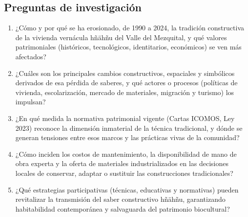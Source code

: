 \subsection{Preguntas de investigación}

\begin{enumerate}
	\item {¿Cómo y por qué se ha erosionado, de 1990 a 2024, la tradición constructiva de la vivienda vernácula hñähñu del Valle del Mezquital, y qué valores patrimoniales (históricos, tecnológicos, identitarios, económicos) se ven más afectados?}

	\item {¿Cuáles son los principales cambios constructivos, espaciales y simbólicos derivados de esa pérdida de saberes, y qué actores o procesos (políticas de vivienda, escolarización, mercado de materiales, migración y turismo) los impulsan?}

	\item {¿En qué medida la normativa patrimonial vigente (Cartas ICOMOS, Ley 2023) reconoce la dimensión inmaterial de la técnica tradicional, y dónde se generan tensiones entre esos marcos y las prácticas vivas de la comunidad?}

	\item {¿Cómo inciden los costos de mantenimiento, la disponibilidad de mano de obra experta y la oferta de materiales industrializados en las decisiones locales de conservar, adaptar o sustituir las construcciones tradicionales?}

	\item {¿Qué estrategias participativas (técnicas, educativas y normativas) pueden revitalizar la transmisión del saber constructivo hñähñu, garantizando habitabilidad contemporánea y salvaguarda del patrimonio biocultural?}
\end{enumerate}
